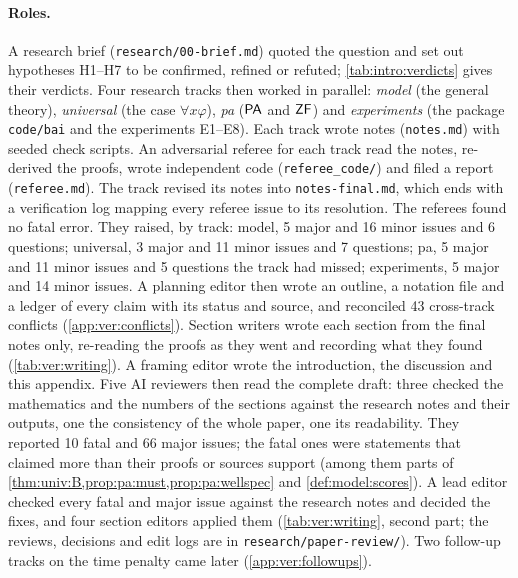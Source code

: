 \paragraph{Roles.} A research brief (\texttt{research/00-brief.md}) quoted the question and set out hypotheses H1--H7 to be confirmed, refined or refuted; \cref{tab:intro:verdicts} gives their verdicts. Four research tracks then worked in parallel: \emph{model} (the general theory), \emph{universal} (the case $\forall x\varphi$), \emph{pa} ($\mathsf{PA}$ and $\mathsf{ZF}$) and \emph{experiments} (the package \texttt{code/bai} and the experiments E1--E8). Each track wrote notes (\texttt{notes.md}) with seeded check scripts. An adversarial referee for each track read the notes, re-derived the proofs, wrote independent code (\texttt{referee\_code/}) and filed a report (\texttt{referee.md}). The track revised its notes into \texttt{notes-final.md}, which ends with a verification log mapping every referee issue to its resolution. The referees found no fatal error. They raised, by track: model, 5 major and 16 minor issues and 6 questions; universal, 3 major and 11 minor issues and 7 questions; pa, 5 major and 11 minor issues and 5 questions the track had missed; experiments, 5 major and 14 minor issues. A planning editor then wrote an outline, a notation file and a ledger of every claim with its status and source, and reconciled 43 cross-track conflicts (\cref{app:ver:conflicts}). Section writers wrote each section from the final notes only, re-reading the proofs as they went and recording what they found (\cref{tab:ver:writing}). A framing editor wrote the introduction, the discussion and this appendix. Five AI reviewers then read the complete draft: three checked the mathematics and the numbers of the sections against the research notes and their outputs, one the consistency of the whole paper, one its readability. They reported 10 fatal and 66 major issues; the fatal ones were statements that claimed more than their proofs or sources support (among them parts of \cref{thm:univ:B,prop:pa:must,prop:pa:wellspec} and \cref{def:model:scores}). A lead editor checked every fatal and major issue against the research notes and decided the fixes, and four section editors applied them (\cref{tab:ver:writing}, second part; the reviews, decisions and edit logs are in \texttt{research/paper-review/}). Two follow-up tracks on the time penalty came later (\cref{app:ver:followups}).


